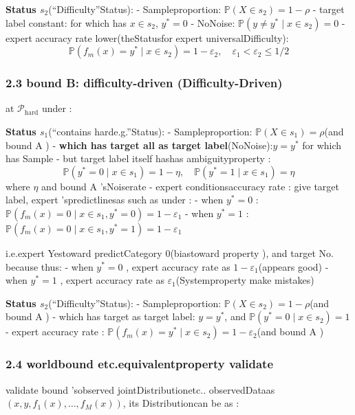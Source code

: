 \documentclass[
  12pt,
]{article}
\begin{document}
\textbf{Status \(s_2\)}(``Difficulty''Status): -
Sampleproportion: \(\mathbb{P}(X \in s_2) = 1 - \rho\) - target label constant: for which has 
\(x \in s_2\), \(y^* = 0\) -
NoNoise: \(\mathbb{P}(y \neq y^* \mid x \in s_2) = 0\) -
expert accuracy rate lower(theStatusfor expert universalDifficulty):
\[\mathbb{P}(f_m(x) = y^* \mid x \in s_2) = 1 - \varepsilon_2, \quad \varepsilon_1 < \varepsilon_2 \leq 1/2\]

\subsubsection{2.3 bound  B: difficulty-driven
(Difficulty-Driven)}\label{ux4e16ux754c-bux96beux5ea6ux9a71ux52a8-difficulty-driven}

at  \(\mathcal{P}_{\text{hard}}\) under : 

\textbf{Status \(s_1\)}(``contains harde.g.''Status): -
Sampleproportion: \(\mathbb{P}(X \in s_1) = \rho\)(and bound  A ) -
\textbf{which has target all as target label}(NoNoise):\(y = y^*\) for which has Sample -
but target label itself hashas ambiguityproperty : 
\[\mathbb{P}(y^* = 0 \mid x \in s_1) = 1 - \eta, \quad \mathbb{P}(y^* = 1 \mid x \in s_1) = \eta\]
where \(\eta\) and bound  A 'sNoiserate  -
expert conditionsaccuracy rate : give target label, expert 'spredictlinesas such as under :  - when  \(y^* = 0\)
: \(\mathbb{P}(f_m(x) = 0 \mid x \in s_1, y^* = 0) = 1 - \varepsilon_1\)
- when  \(y^* = 1\)
: \(\mathbb{P}(f_m(x) = 0 \mid x \in s_1, y^* = 1) = 1 - \varepsilon_1\)

i.e.expert Yestoward predictCategory \(0\)(biastoward property ), and target No. because thus:  - when 
\(y^* = 0\) , expert accuracy rate as  \(1 - \varepsilon_1\)(appears good) - when 
\(y^* = 1\) , expert accuracy rate as  \(\varepsilon_1\)(Systemproperty make mistakes)

\textbf{Status \(s_2\)}(``Difficulty''Status): -
Sampleproportion: \(\mathbb{P}(X \in s_2) = 1 - \rho\)(and bound  A ) -
which has target as target label: \(y = y^*\), and 
\(\mathbb{P}(y^* = 0 \mid x \in s_2) = 1\) -
expert accuracy rate : \(\mathbb{P}(f_m(x) = y^* \mid x \in s_2) = 1 - \varepsilon_2\)(and bound 
A )

\subsubsection{2.4
worldbound etc.equivalentproperty validate }\label{ux4e16ux754cux7b49ux4ef7ux6027ux9a8cux8bc1}

validate bound 'sobserved jointDistributionetc.. observedDataas 
\((x, y, f_1(x), \dots, f_M(x))\), its Distributioncan be as : 
\end{document}
